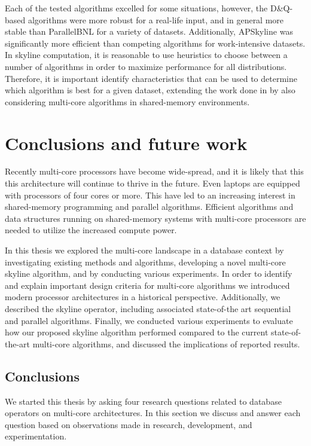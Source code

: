 \documentclass[12pt,a4paper,twoside]{report}
\begin{document}
Each of the tested algorithms excelled for some situations, however,
the D\&Q-based algorithms were more robust for a real-life input, and
in general more stable than ParallelBNL for a variety of datasets.
Additionally, APSkyline was significantly more efficient than
competing algorithms for work-intensive datasets. In skyline
computation, it is reasonable to use heuristics to choose between a
number of algorithms in order to maximize performance for all
distributions. Therefore, it is important identify characteristics
that can be used to determine which algorithm is best for a given
dataset, extending the work done in
\cite{chaudhuri2006robust,godfrey2004skyline,karnsteclt2007cost,lu2008effective}
by also considering multi-core algorithms in shared-memory
environments.

\cleardoublepage
\chapter{Conclusions and future work}

Recently multi-core processors have become wide-spread, and it is
likely that this this architecture will continue to thrive in the
future. Even laptops are equipped with processors of four cores or
more. This have led to an increasing interest in shared-memory
programming and parallel algorithms. Efficient algorithms and data
structures running on shared-memory systems with multi-core processors
are needed to utilize the increased compute power.

In this thesis we explored the multi-core landscape in a database
context by investigating existing methods and algorithms, developing a
novel multi-core skyline algorithm, and by conducting various
experiments. In order to identify and explain important design
criteria for multi-core algorithms we introduced modern processor
architectures in a historical perspective. Additionally, we described
the skyline operator, including associated state-of-the art sequential
and parallel algorithms. Finally, we conducted various experiments to
evaluate how our proposed skyline algorithm performed compared to the
current state-of-the-art multi-core algorithms, and discussed the
implications of reported results. 

\section{Conclusions}

We started this thesis by asking four research questions related to
database operators on multi-core architectures. In this section we
discuss and answer each question based on observations made in
research, development, and experimentation.
\end{document}
